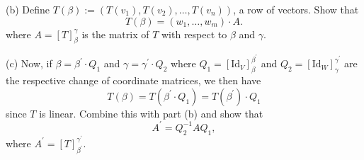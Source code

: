 \documentclass[11pt]{article}
\theoremstyle{plain}
\theoremstyle{definition}
\begin{document}
\begin{enumerate}
(b) Define $T(\beta):= (T(v_1),T(v_2),\dots, T(v_n))$, a row of vectors. Show that
\[
T(\beta)= (w_1,\dots, w_m)\cdot A.
\]
where $A= [T]_\beta^\gamma $ is the matrix of $T$ with respect to $\beta$ and $\gamma$.

(c) Now, if $\beta = \beta^\prime \cdot Q_1$ and $\gamma = \gamma^\prime \cdot Q_2$ where 
$Q_1=[\mathrm{Id}_V]_\beta^{\beta^\prime}$ and $Q_2=[\mathrm{Id}_W]_\gamma^{\gamma^\prime}$ are the respective change of coordinate matrices, we then have
\[
T(\beta) = T(\beta^\prime \cdot Q_1)= T(\beta^\prime) \cdot Q_1
\]
since $T$ is linear. Combine this with part (b) and show that
\[
A^\prime = Q_2^{-1} A Q_1,
\]
where $A^\prime = [T]_{\beta^\prime}^{\gamma^\prime}$.

\end{enumerate}
\end{document}
